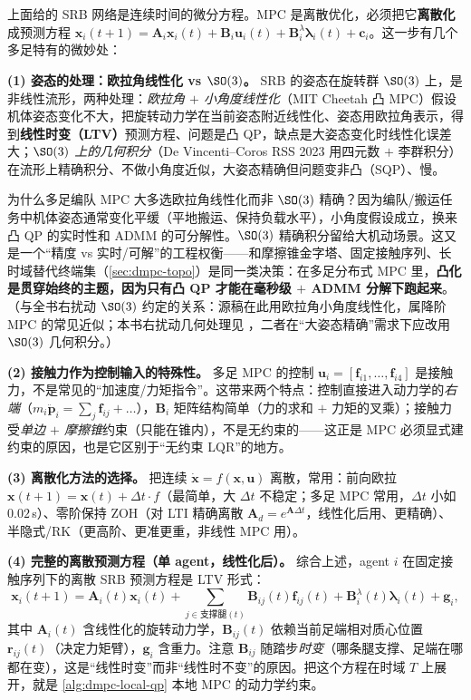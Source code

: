 上面给的 SRB 网络是连续时间的微分方程。MPC 是离散优化，必须把它\textbf{离散化}成预测方程 $\mathbf{x}_i(t{+}1)=\mathbf{A}_i\mathbf{x}_i(t)+\mathbf{B}_i\mathbf{u}_i(t)+\mathbf{B}_i^\lambda\boldsymbol{\lambda}_i(t)+\mathbf{c}_i$。这一步有几个多足特有的微妙处：

\textbf{(1) 姿态的处理：欧拉角线性化 vs $\SO(3)$。} SRB 的姿态在旋转群 $\SO(3)$ 上，是非线性流形，两种处理：\emph{欧拉角 $+$ 小角度线性化}（MIT Cheetah 凸 MPC\cite{dicarlo2018cheetah}）假设机体姿态变化不大，把旋转动力学在当前姿态附近线性化、姿态用欧拉角表示，得到\textbf{线性时变（LTV）}预测方程、问题是凸 QP，缺点是大姿态变化时线性化误差大；\emph{$\SO(3)$ 上的几何积分}（De Vincenti--Coros RSS 2023\cite{devincenti2023centralized} 用四元数 $+$ 李群积分）在流形上精确积分、不做小角度近似，大姿态精确但问题变非凸（SQP）、慢。

\begin{insight}[凸化是贯穿始终的主题]\label{ins:dmpc-convexify}
为什么多足编队 MPC 大多选欧拉角线性化而非 $\SO(3)$ 精确？因为编队/搬运任务中机体姿态通常变化平缓（平地搬运、保持负载水平），小角度假设成立，换来凸 QP 的实时性和 ADMM 的可分解性。$\SO(3)$ 精确积分留给大机动场景。这又是一个“精度 vs 实时/可解”的工程权衡——和摩擦锥金字塔、固定接触序列、长时域替代终端集（\cref{sec:dmpc-topo}）是同一类决策：在多足分布式 MPC 里，\textbf{凸化是贯穿始终的主题，因为只有凸 QP 才能在毫秒级 $+$ ADMM 分解下跑起来}。（与全书右扰动 $\SO(3)$ 约定的关系：源稿在此用欧拉角小角度线性化，属降阶 MPC 的常见近似；本书右扰动几何处理见 ，二者在“大姿态精确”需求下应改用 $\SO(3)$ 几何积分。）
\end{insight}

\textbf{(2) 接触力作为控制输入的特殊性。} 多足 MPC 的控制 $\mathbf{u}_i=[\mathbf{f}_{i1},\dots,\mathbf{f}_{i4}]$ 是接触力，不是常见的“加速度/力矩指令”。这带来两个特点：控制直接进入动力学的\emph{右端}（$m_i\ddot{\mathbf{p}}_i=\sum_j\mathbf{f}_{ij}+\dots$），$\mathbf{B}_i$ 矩阵结构简单（力的求和 $+$ 力矩的叉乘）；接触力受\emph{单边 $+$ 摩擦锥}约束（只能在锥内），不是无约束的——这正是 MPC 必须显式建约束的原因，也是它区别于“无约束 LQR”的地方。

\textbf{(3) 离散化方法的选择。} 把连续 $\dot{\mathbf{x}}=f(\mathbf{x},\mathbf{u})$ 离散，常用：前向欧拉 $\mathbf{x}(t{+}1)=\mathbf{x}(t)+\Delta t\cdot f$（最简单，大 $\Delta t$ 不稳定；多足 MPC 常用，$\Delta t$ 小如 $0.02$\,s）、零阶保持 ZOH（对 LTI 精确离散 $\mathbf{A}_d=e^{\mathbf{A}\Delta t}$，线性化后用、更精确）、半隐式/RK（更高阶、更准更重，非线性 MPC 用）。

\textbf{(4) 完整的离散预测方程（单 agent，线性化后）。} 综合上述，agent $i$ 在固定接触序列下的离散 SRB 预测方程是 LTV 形式：
\begin{equation}
  \mathbf{x}_i(t{+}1)=\mathbf{A}_i(t)\mathbf{x}_i(t)+\sum_{j\in\text{支撑腿}(t)}\mathbf{B}_{ij}(t)\mathbf{f}_{ij}(t)+\mathbf{B}_i^\lambda(t)\boldsymbol{\lambda}_i(t)+\mathbf{g}_i,
  \label{eq:dmpc-ltv}
\end{equation}
其中 $\mathbf{A}_i(t)$ 含线性化的旋转动力学，$\mathbf{B}_{ij}(t)$ 依赖当前足端相对质心位置 $\mathbf{r}_{ij}(t)$（决定力矩臂），$\mathbf{g}_i$ 含重力。注意 $\mathbf{B}_{ij}$ 随踏步\emph{时变}（哪条腿支撑、足端在哪都在变），这是“线性时变”而非“线性时不变”的原因。把这个方程在时域 $T$ 上展开，就是 \cref{alg:dmpc-local-qp} 本地 MPC 的动力学约束。

